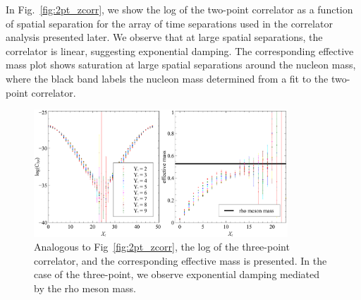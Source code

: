 \documentclass{PoS}
\begin{document}
In Fig.~\ref{fig:2pt_zcorr}, we show the log of the two-point correlator as a function of spatial separation for the array of time separations used in the correlator analysis presented later. We observe that at large spatial separations, the correlator is linear, suggesting exponential damping. The corresponding effective mass plot shows saturation at large spatial separations around the nucleon mass, where the black band labels the nucleon mass determined from a fit to the two-point correlator.

\begin{figure}[h]
	\centering
		\includegraphics[width=0.85\textwidth]{./3ptzcorr.pdf}
	\caption{Analogous to Fig~\ref{fig:2pt_zcorr}, the log of the three-point correlator, and the corresponding effective mass is presented. In the case of the three-point, we observe exponential damping mediated by the rho meson mass.}
	\label{fig:3pt_zcorr}
\end{figure}
\end{document}
